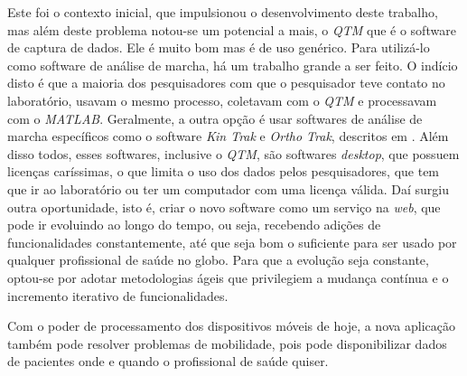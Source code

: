 Este foi o contexto inicial, que impulsionou o desenvolvimento deste trabalho,
mas além deste problema notou-se um potencial a mais, o \emph{QTM} que é o software 
de captura de dados. Ele é muito bom mas é de uso genérico. Para utilizá-lo como 
software de análise de marcha, há um trabalho grande a ser feito. O indício disto é 
que a maioria dos pesquisadores com que o pesquisador teve contato no laboratório, 
usavam o mesmo processo, coletavam com o \emph{QTM} e processavam com o \emph{MATLAB}. 
Geralmente, a outra opção é usar softwares de análise de marcha específicos como 
o software \emph{Kin Trak} e \emph{Ortho Trak}, descritos em . Além disso todos, esses softwares, inclusive o
\emph{QTM}, são softwares \emph{desktop}, que possuem licenças caríssimas, o que limita o
uso dos dados pelos pesquisadores, que tem que ir ao laboratório ou ter um computador
com uma licença válida. Daí surgiu outra oportunidade, isto é, criar o novo software 
como um serviço na \emph{web}, que pode ir evoluindo ao longo do tempo, ou seja,
recebendo adições de funcionalidades constantemente, até que seja bom o suficiente
para ser usado por qualquer profissional de saúde no globo.
Para que a evolução seja constante, optou-se por adotar metodologias ágeis que privilegiem a mudança contínua e o incremento iterativo de funcionalidades.

Com o poder de processamento dos dispositivos móveis de hoje, a nova
aplicação também pode resolver problemas de mobilidade, pois pode disponibilizar dados de pacientes
onde e quando o profissional de saúde quiser.

